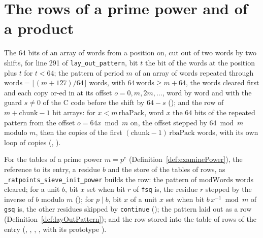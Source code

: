 \section{The rows of a prime power and of a product}\label{sec:compositeRows}

\begin{definition}\label{def:layOutPattern}
  \leanok
  The $64$ bits of an array of words from a position on, cut out of two words by two shifts, for
  line 291 of \verb|lay_out_pattern|, bit $t$ the bit of the words at the position plus $t$ for
  $t < 64$; the pattern of period $m$ of an array of words repeated through
  $\mathrm{words} = \lfloor (m + 127)/64 \rfloor$ words, with $64\,\mathrm{words} \ge m + 64$, the
  words cleared first and each copy or-ed in at its offset $o = 0, m, 2m, \dots$, word by word and
  with the guard $s \ne 0$ of the C code before the shift by $64 - s$ ();
  and the row of $m + \mathrm{chunk} - 1$ bit arrays: for $x < m\,\mathrm{rbaPack}$, word $x$ the
  $64$ bits of the repeated pattern from the offset $o = 64 x \bmod m$ on, the offset stepped by
  $64 \bmod m$ modulo $m$, then the copies of the first $(\mathrm{chunk} - 1)\,\mathrm{rbaPack}$
  words, with its own loop of copies (, ).
\end{definition}

\begin{definition}\label{def:sieveInitPower}
  \leanok
  For the tables of a prime power $m = p^e$ (Definition~\ref{def:examinePower}), the reference to
  its entry, a residue $b$ and the store of the tables of rows, as
  \verb|_ratpoints_sieve_init_power| builds the row: the pattern of $\mathrm{modWords}$ words
  cleared; for a unit $b$, bit $x$ set when bit $r$ of \verb|fsq| is, the residue $r$ stepped by the
  inverse of $b$ modulo $m$ (); for $p \mid b$, bit $x$ of a unit $x$ set
  when bit $b\, x^{-1} \bmod m$ of \verb|gsq| is, the other residues skipped by \verb|continue|
  (); the pattern laid out as a row (Definition~\ref{def:layOutPattern});
  and the row stored into the table of rows of the entry (,
  , , , with its
  prototype ).
\end{definition}

